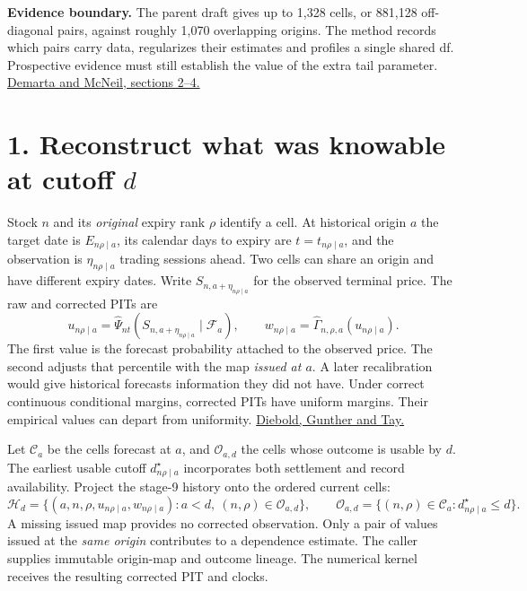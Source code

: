 \documentclass[11pt,letterpaper]{article}
\newcommand{\sect}[1]{\section*{\color{ink}#1}}
\newcommand{\lead}[1]{\textbf{\textcolor{accent}{#1}}}
\newcommand{\wc}{w_{n\rho\mid a}}
\newcommand{\src}[2]{\href{#1}{#2}}
\begin{document}
\smallskip
\lead{Evidence boundary.} The parent draft gives up to 1,328 cells, or 881,128 off-diagonal pairs, against roughly 1,070 overlapping origins. The method records which pairs carry data, regularizes their estimates and profiles a single shared df. Prospective evidence must still establish the value of the extra tail parameter. \src{https://doi.org/10.1111/j.1751-5823.2005.tb00254.x}{Demarta and McNeil, sections 2--4.}

\newpage
\sect{1. Reconstruct what was knowable at cutoff \(d\)}
Stock \(n\) and its \emph{original} expiry rank \(\rho\) identify a cell. At historical origin \(a\) the target date is \(E_{n\rho\mid a}\), its calendar days to expiry are \(t=t_{n\rho\mid a}\), and the observation is \(\eta_{n\rho\mid a}\) trading sessions ahead. Two cells can share an origin and have different expiry dates. Write \(S_{n,a+\eta_{n\rho\mid a}}\) for the observed terminal price. The raw and corrected PITs are
\[
 u_{n\rho\mid a}=\widehat\Psi_{nt}
 (S_{n,a+\eta_{n\rho\mid a}}\mid\mathcal F_a),
 \qquad
 \wc=\widehat\Gamma_{n,\rho,a}(u_{n\rho\mid a}).
\]
The first value is the forecast probability attached to the observed price. The second adjusts that percentile with the map \emph{issued at \(a\)}. A later recalibration would give historical forecasts information they did not have. Under correct continuous conditional margins, corrected PITs have uniform margins. Their empirical values can depart from uniformity. \src{https://users.ssc.wisc.edu/~behansen/718/DieboldGuntherTay1998.pdf}{Diebold, Gunther and Tay.}

Let \(\mathcal C_a\) be the cells forecast at \(a\), and \(\mathcal O_{a,d}\) the cells whose outcome is usable by \(d\). The earliest usable cutoff \(d^\star_{n\rho\mid a}\) incorporates both settlement and record availability. Project the stage-9 history onto the ordered current cells:
\[
 \mathcal H_d=\{(a,n,\rho,u_{n\rho\mid a},\wc):
 a<d,\ (n,\rho)\in\mathcal O_{a,d}\},\qquad
 \mathcal O_{a,d}=\{(n,\rho)\in\mathcal C_a:d^\star_{n\rho\mid a}\le d\}.
\]
A missing issued map provides no corrected observation. Only a pair of values issued at the \emph{same origin} contributes to a dependence estimate. The caller supplies immutable origin-map and outcome lineage. The numerical kernel receives the resulting corrected PIT and clocks.
\end{document}
